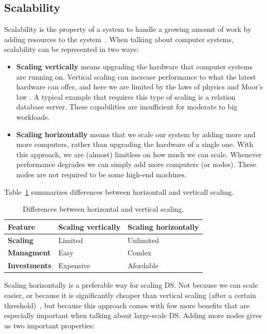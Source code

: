 \subsection{Scalability}\label{sec:scalability}
%
Scalability is the property of a system to handle a growing amount of work by adding resources to the system~\cite{Bondi00}. When talking about computer systems, scalability can be represented in two ways:

\begin{itemize}
	\item \textbf{Scaling vertically} means upgrading the hardware that computer systems are running on. Vertical scaling can increase performance to what the latest hardware can offer, and here we are limited by the laws of physics and Moor's law \cite{Gustafson2011}. A typical example that requires this type of scaling is a relation database server. These capabilities are insufficient for moderate to big workloads.
	\item \textbf{Scaling horizontally} means that we scale our system by adding more and more computers, rather than upgrading the hardware of a single one. With this approach, we are (almost) limitless on how much we can scale. Whenever performance degrades we can simply add more computers (or nodes). These nodes are not required to be some high-end machines.
\end{itemize}

\noindent
Table~\ref{tab:table1} summarizes differences between horizontall and verticall scaling.

\begin{table}[h!]
	\begin{center}
		\begin{tabular}{l|l|l}
			\textbf{Feature} & \textbf{Scaling vertically} & \textbf{Scaling horizontally}\\
			\hline
			\textbf{Scaling} & Limited & Unlimited \\
			\textbf{Managment} & Easy & Comlex\\
			\textbf{Investments} & Expensive & Afordable \\
		\end{tabular}
	\end{center}
	\vspace{-0.5cm}
	\caption{Differences between horizontal and vertical scaling.}
	\label{tab:table1}
\end{table}

\noindent
Scaling horizontally is a preferable way for scaling DS. Not because we can scale easier, or because it is significantly cheaper than vertical scaling (after a certain threshold)~\cite{Bondi00}, but because this approach comes with few more benefits that are especially important when talking about large-scale DS. Adding more nodes gives us two important properties: 

